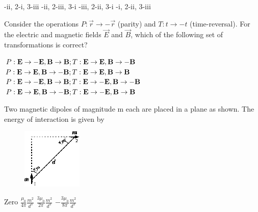 \documentclass{exam}
\begin{document}
\begin{questions}
\begin{multicols}{2}
\end{multicols}


\begin{choices}
	\begin{multicols}{2}
	 -ii, 2-i, 3-iii -ii, 2-iii, 3-i -iii, 2-ii, 3-i -i, 2-ii, 3-iii
	\end{multicols}
\end{choices}

\question Consider the operations $P:\vec{r}\rightarrow-\vec{r}$ (parity) and $T:t\rightarrow-t$ (time-reversal). For the electric and magnetic fields $\vec{E}$ and $\vec{B}$, which of the following set of transformations is correct?\hfill{}

\begin{choices}
	\begin{multicols}{2}
	 \choice $P:\vec{E}\rightarrow-\vec{E},\vec{B}\rightarrow\vec{B};\\ T:\vec{E}\rightarrow\vec{E},\vec{B}\rightarrow-\vec{B}$
	\choice $P:\vec{E}\rightarrow\vec{E},\vec{B}\rightarrow-\vec{B};\\ T:\vec{E}\rightarrow\vec{E},\vec{B}\rightarrow\vec{B}$
	\choice $P:\vec{E}\rightarrow-\vec{E},\vec{B}\rightarrow\vec{B};\\ T:\vec{E}\rightarrow-\vec{E},\vec{B}\rightarrow-\vec{B}$
	\choice $P:\vec{E}\rightarrow\vec{E},\vec{B}\rightarrow-\vec{B};\\ T:\vec{E}\rightarrow-\vec{E},\vec{B}\rightarrow\vec{B}$
	\end{multicols}
\end{choices}

\question Two magnetic dipoles of magnitude m each are placed in a plane as shown. The energy of interaction is given by\hfill{}
	\begin{figure}[H] \centering
		\caption*{} \label{38} \includegraphics[width=0.1\columnwidth]{pics/38.png}
	\end{figure}


\begin{oneparchoices}
	\choice Zero \choice $\frac{\mu_{0}}{4\pi}\frac{m^{2}}{d^{3}}$ \choice $\frac{3\mu_{0}}{2\pi}\frac{m^{2}}{d^{3}}$ \choice $-\frac{3\mu_{0}}{8\pi}\frac{m^{2}}{d^{3}}$
\end{oneparchoices}


\end{questions}
\end{document}
